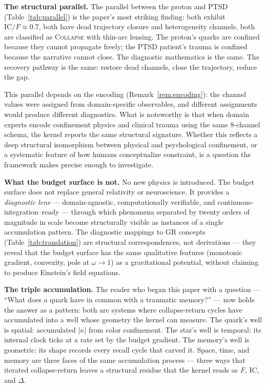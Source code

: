 \documentclass[
  aps,
  prd,
  twocolumn,
  superscriptaddress,
  nofootinbib,
  floatfix
]{revtex4-2}
\newcommand{\regime}[1]{\textsc{#1}}
\newcommand{\IC}{\mathrm{IC}}
\begin{document}
\textbf{The structural parallel.}
The parallel between the proton and PTSD
(Table~\ref{tab:parallel}) is the paper's most striking
finding: both exhibit $\IC/F \approx 0.7$, both have dead
trajectory closure and heterogeneity channels, both are
classified as \regime{Collapse} with thin-arc lensing.  The
proton's quarks are confined because they cannot propagate
freely; the PTSD patient's trauma is confined because the
narrative cannot close.  The diagnostic mathematics is the
same.  The recovery pathway is the same: restore dead
channels, close the trajectory, reduce the gap.

This parallel depends on the encoding
(Remark~\ref{rem:encoding}): the channel values were
assigned from domain-specific observables, and different
assignments would produce different diagnostics.  What is
noteworthy is that when domain experts encode confinement
physics and clinical trauma using the same 8-channel schema,
the kernel reports the same structural signature.  Whether
this reflects a deep structural isomorphism between physical
and psychological confinement, or a systematic feature of how
humans conceptualize constraint, is a question the framework
makes precise enough to investigate.

\textbf{What the budget surface is not.}
No new physics is introduced.  The budget surface does not
replace general relativity or neuroscience.  It provides a
\emph{diagnostic lens} --- domain-agnostic, computationally
verifiable, and continuous-integration--ready --- through which
phenomena separated by twenty orders of magnitude in scale
become structurally visible as instances of a single
accumulation pattern.  The diagnostic mappings to GR concepts
(Table~\ref{tab:translation}) are structural correspondences,
not derivations --- they reveal that the budget surface has
the same qualitative features (monotonic gradient,
convexity, pole at $\omega \to 1$) as a gravitational
potential, without claiming to produce Einstein's field
equations.

\textbf{The triple accumulation.}
The reader who began this paper with a question --- ``What
does a quark have in common with a traumatic memory?'' ---
now holds the answer as a pattern: both are systems where
collapse-return cycles have accumulated into a well whose
geometry the kernel can measure.  The quark's well is
spatial: accumulated $|\kappa|$ from color confinement.  The
star's well is temporal: its internal clock ticks at a rate
set by the budget gradient.  The memory's well is geometric:
its shape records every recall cycle that carved it.  Space,
time, and memory are three faces of the same accumulation
process --- three ways that iterated collapse-return leaves a
structural residue that the kernel reads as $F$, $\IC$, and
$\Delta$.
\end{document}
